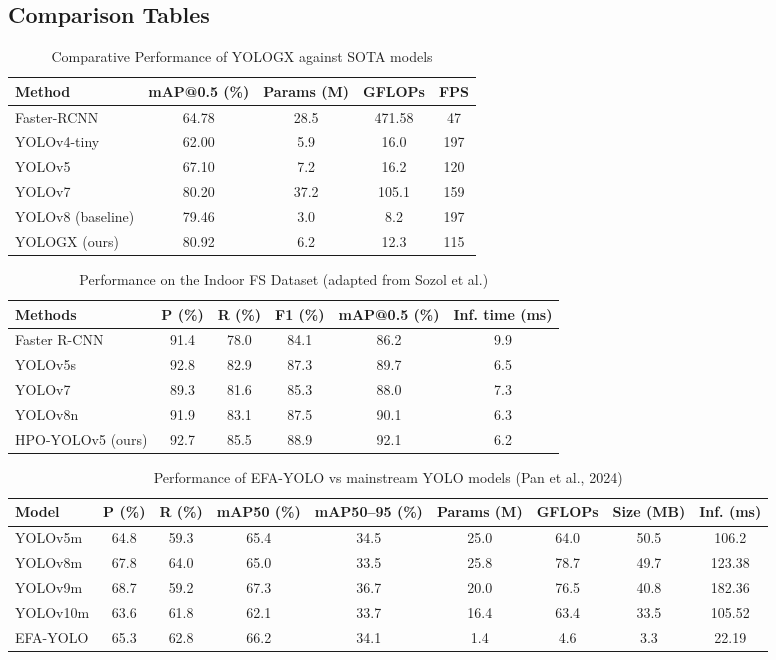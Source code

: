 \documentclass[12pt,a4paper]{article}
\begin{document}
\subsection{Comparison Tables}
\begin{table}[h]
  \centering
  \caption{Comparative Performance of YOLOGX against SOTA models}
  \small
  \begin{tabular}{lcccc}
    \toprule
    Method & mAP@0.5 (\%) & Params (M) & GFLOPs & FPS \\
    \midrule
    Faster-RCNN & 64.78 & 28.5 & 471.58 & 47 \\
    YOLOv4-tiny & 62.00 & 5.9 & 16.0 & 197 \\
    YOLOv5 & 67.10 & 7.2 & 16.2 & 120 \\
    YOLOv7 & 80.20 & 37.2 & 105.1 & 159 \\
    YOLOv8 (baseline) & 79.46 & 3.0 & 8.2 & 197 \\
    YOLOGX (ours) & 80.92 & 6.2 & 12.3 & 115 \\
    \bottomrule
  \end{tabular}
\end{table}
\FloatBarrier

\begin{table}[h]
  \centering
  \caption{Performance on the Indoor FS Dataset (adapted from Sozol et al.)}
  \small
  \begin{tabular}{lccccc}
    \toprule
    Methods & P (\%) & R (\%) & F1 (\%) & mAP@0.5 (\%) & Inf. time (ms) \\
    \midrule
    Faster R-CNN & 91.4 & 78.0 & 84.1 & 86.2 & 9.9 \\
    YOLOv5s & 92.8 & 82.9 & 87.3 & 89.7 & 6.5 \\
    YOLOv7 & 89.3 & 81.6 & 85.3 & 88.0 & 7.3 \\
    YOLOv8n & 91.9 & 83.1 & 87.5 & 90.1 & 6.3 \\
    HPO-YOLOv5 (ours) & 92.7 & 85.5 & 88.9 & 92.1 & 6.2 \\
    \bottomrule
  \end{tabular}
\end{table}
\FloatBarrier

\begin{table}[h]
  \centering
  \caption{Performance of EFA-YOLO vs mainstream YOLO models (Pan et al., 2024)}
  \small
  \begin{tabular}{lcccccccc}
    \toprule
    Model & P (\%) & R (\%) & mAP50 (\%) & mAP50--95 (\%) & Params (M) & GFLOPs & Size (MB) & Inf. (ms) \\
    \midrule
    YOLOv5m & 64.8 & 59.3 & 65.4 & 34.5 & 25.0 & 64.0 & 50.5 & 106.2 \\
    YOLOv8m & 67.8 & 64.0 & 65.0 & 33.5 & 25.8 & 78.7 & 49.7 & 123.38 \\
    YOLOv9m & 68.7 & 59.2 & 67.3 & 36.7 & 20.0 & 76.5 & 40.8 & 182.36 \\
    YOLOv10m & 63.6 & 61.8 & 62.1 & 33.7 & 16.4 & 63.4 & 33.5 & 105.52 \\
    EFA-YOLO & 65.3 & 62.8 & 66.2 & 34.1 & 1.4 & 4.6 & 3.3 & 22.19 \\
    \bottomrule
  \end{tabular}
\end{table}
\FloatBarrier
\end{document}
